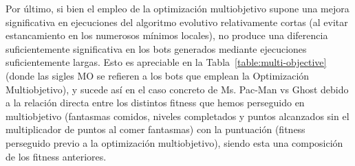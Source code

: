 Por último, si bien el empleo de la optimización multiobjetivo supone una mejora significativa en ejecuciones del algoritmo evolutivo relativamente cortas (al evitar estancamiento en los numerosos mínimos locales), no produce una diferencia suficientemente significativa en los bots generados mediante ejecuciones suficientemente largas. Esto es apreciable en la Tabla~\ref{table:multi-objective} (donde las sigles MO se refieren a los bots que emplean la Optimización Multiobjetivo), y sucede así en el caso concreto de Ms. Pac-Man vs Ghost debido a la relación directa entre los distintos fitness que hemos perseguido en multiobjetivo (fantasmas comidos, niveles completados y puntos alcanzados sin el multiplicador de puntos al comer fantasmas) con la puntuación (fitness perseguido previo a la optimización multiobjetivo), siendo esta una composición de los fitness anteriores.
